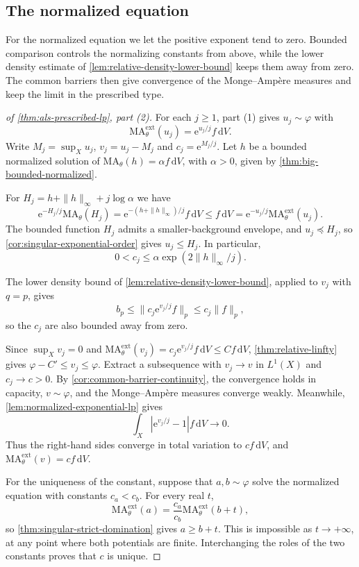 \subsection{The normalized equation}

For the normalized equation we let the positive exponent tend to zero. Bounded comparison controls the normalizing constants from above, while the lower density estimate of \cref{lem:relative-density-lower-bound} keeps them away from zero. The common barriers then give convergence of the Monge--Amp\`ere measures and keep the limit in the prescribed type.

\begin{proof}[of \cref{thm:als-prescribed-lp}, part (2)]
For each $j\geq1$, part (1) gives $u_j\sim\varphi$ with
\[
 \mathrm{MA}^{\mathrm{ext}}_\theta(u_j)=\mathrm{e}^{u_j/j}f\,\mathrm{d}V.
\]
Write $M_j=\sup_Xu_j$, $v_j=u_j-M_j$ and $c_j=\mathrm{e}^{M_j/j}$. Let $h$ be a bounded normalized solution of $\mathrm{MA}_\theta(h)=\alpha f\,\mathrm{d}V$, with $\alpha>0$, given by \cref{thm:big-bounded-normalized}.

For $H_j=h+\|h\|_\infty+j\log\alpha$ we have
\[
 \mathrm{e}^{-H_j/j}\mathrm{MA}_\theta(H_j)
 =\mathrm{e}^{-(h+\|h\|_\infty)/j}f\,\mathrm{d}V
 \leq f\,\mathrm{d}V
 =\mathrm{e}^{-u_j/j}\mathrm{MA}^{\mathrm{ext}}_\theta(u_j).
\]
The bounded function $H_j$ admits a smaller-background envelope, and $u_j\preceq H_j$, so \cref{cor:singular-exponential-order} gives $u_j\leq H_j$. In particular,
\[
 0<c_j\leq\alpha\exp(2\|h\|_\infty/j).
\]

The lower density bound of \cref{lem:relative-density-lower-bound}, applied to $v_j$ with $q=p$, gives
\[
 b_p\leq\|c_j\mathrm{e}^{v_j/j}f\|_p\leq c_j\|f\|_p,
\]
so the $c_j$ are also bounded away from zero.

Since $\sup_Xv_j=0$ and $\mathrm{MA}^{\mathrm{ext}}_\theta(v_j)=c_j\mathrm{e}^{v_j/j}f\,\mathrm{d}V\leq C f\,\mathrm{d}V$, \cref{thm:relative-linfty} gives $\varphi-C'\leq v_j\leq\varphi$. Extract a subsequence with $v_j\to v$ in $L^1(X)$ and $c_j\to c>0$. By \cref{cor:common-barrier-continuity}, the convergence holds in capacity, $v\sim\varphi$, and the Monge--Amp\`ere measures converge weakly. Meanwhile, \cref{lem:normalized-exponential-lp} gives
\[
 \int_X|\mathrm{e}^{v_j/j}-1|f\,\mathrm{d}V\longrightarrow0.
\]
Thus the right-hand sides converge in total variation to $cf\,\mathrm{d}V$, and $\mathrm{MA}^{\mathrm{ext}}_\theta(v)=cf\,\mathrm{d}V$.

For the uniqueness of the constant, suppose that $a,b\sim\varphi$ solve the normalized equation with constants $c_a<c_b$. For every real $t$,
\[
 \mathrm{MA}^{\mathrm{ext}}_\theta(a)
 =\frac{c_a}{c_b}\mathrm{MA}^{\mathrm{ext}}_\theta(b+t),
\]
so \cref{thm:singular-strict-domination} gives $a\geq b+t$. This is impossible as $t\to+\infty$, at any point where both potentials are finite. Interchanging the roles of the two constants proves that $c$ is unique.
\end{proof}
